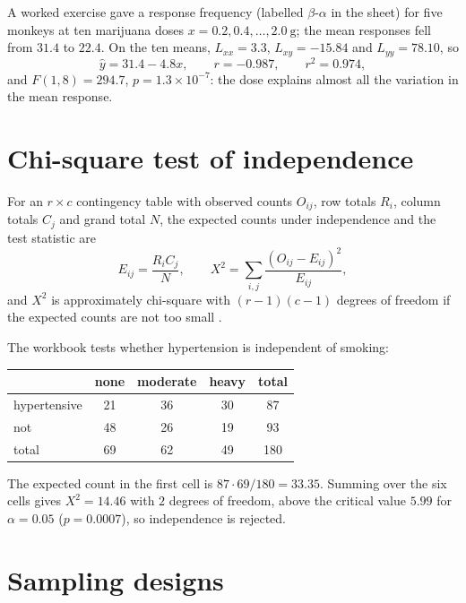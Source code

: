 \begin{example}
\label{example-regression-monkeys}
A worked exercise gave a response
frequency (labelled
$\beta$-$\alpha$ in the sheet) for five
monkeys at ten marijuana doses $x = 0.2,
0.4, \dots, 2.0\ \mathrm{g}$; the mean
responses fell from $31.4$ to $22.4$.
On the ten means, $L_{xx} = 3.3$,
$L_{xy} = -15.84$ and
$L_{yy} = 78.10$, so
$$
\hat{y} = 31.4 - 4.8x,
\qquad r = -0.987,
\qquad r^2 = 0.974,
$$
and $F(1,8) = 294.7$, $p = 1.3 \times
10^{-7}$: the dose explains almost all
the variation in the mean response.
\end{example}

\section{Chi-square test of independence}
\label{section-chi-square}

For an $r \times c$ contingency table
with observed counts $O_{ij}$, row totals
$R_i$, column totals $C_j$ and grand
total $N$, the expected counts under
independence and the test statistic are
$$
E_{ij} = \frac{R_i C_j}{N},
\qquad
X^2 = \sum_{i,j}
\frac{(O_{ij} - E_{ij})^2}{E_{ij}},
$$
and $X^2$ is approximately chi-square
with $(r-1)(c-1)$ degrees of freedom if
the expected counts are not too small
\cite[Section
10.6]{rosner2011biostatistics}.

\begin{example}
\label{example-chi-square-smoking}
The workbook tests whether
hypertension is independent of smoking:
\begin{center}
\begin{tabular}{lcccc}
 & none & moderate & heavy & total \\
\hline
hypertensive & 21 & 36 & 30 & 87 \\
not & 48 & 26 & 19 & 93 \\
\hline
total & 69 & 62 & 49 & 180 \\
\end{tabular}
\end{center}
The expected count in the first cell is
$87 \cdot 69/180 = 33.35$. Summing over
the six cells gives $X^2 = 14.46$ with
$2$ degrees of freedom, above the
critical value $5.99$ for
$\alpha = 0.05$ ($p = 0.0007$), so
independence is rejected.
\end{example}

\section{Sampling designs}
\label{section-sampling}


